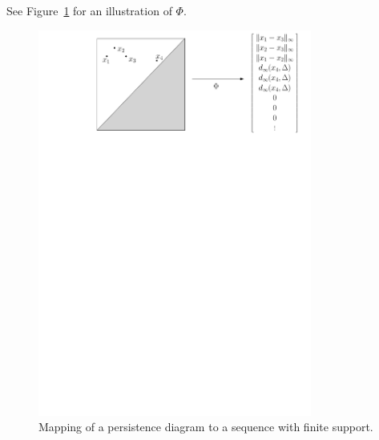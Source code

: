 See Figure~\ref{fig:Mapping} for an illustration of $\Phi$.

\begin{figure}[h] 
\begin{center} 
\includegraphics[width = 9cm]{figures/Mapping} 
\caption{\label{fig:Mapping}
Mapping of a persistence diagram to a sequence with finite support. %
} 
\end{center} 
\end{figure}

